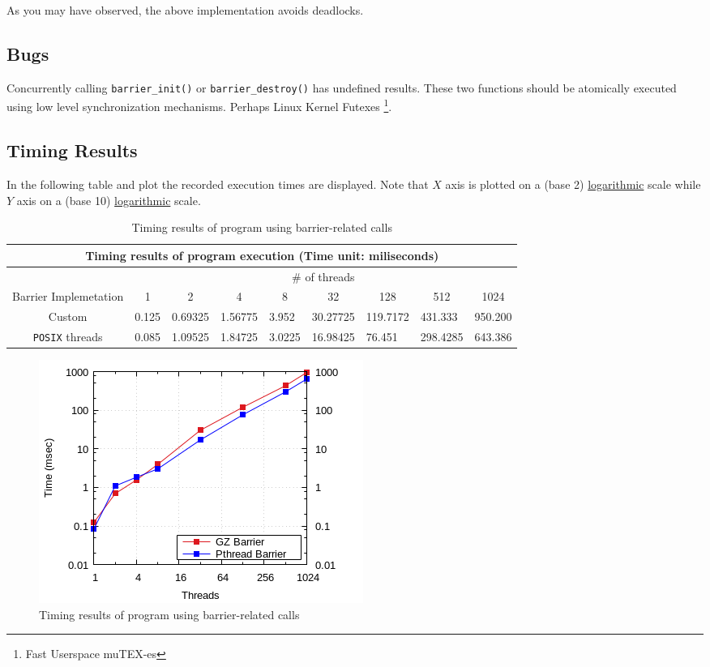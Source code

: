 \documentclass{article}
\def\code#1{\texttt{#1}}
\begin{document}
\hspace{-0.6cm} As you may have observed, the above implementation avoids deadlocks.

\subsection{Bugs}
Concurrently calling \code{barrier\_init()} or \code{barrier\_destroy()} has undefined results.
These two functions should be atomically executed using low level synchronization mechanisms.
Perhaps Linux Kernel Futexes \footnote{Fast Userspace muTEX-es}.

\newpage 

\subsection{Timing Results}
In the following table and plot the recorded execution times are displayed.
Note that $X$ axis is plotted on a (base 2) \underline{logarithmic} scale while
$Y$ axis on a (base 10) \underline{logarithmic} scale.


\begin{table}[htbp]
  \centering
    \begin{tabular}{|c||l|l|l|l|l|l|l|l|} 
    \hline
    \multicolumn{9}{|c|}{Timing results of program execution (Time unit: miliseconds)} \\
    \hline
    & \multicolumn{8}{|c|}{\# of threads} \\
    \hline
    Barrier Implemetation  & \multicolumn{1}{|c|}{1} & \multicolumn{1}{|c|}{2} & \multicolumn{1}{|c|}{4} &
    \multicolumn{1}{|c|}{8} & \multicolumn{1}{|c|}{32} & \multicolumn{1}{|c|}{128} & \multicolumn{1}{|c|}{512} & 
    \multicolumn{1}{|c|}{1024}\\
    \hline\hline
    Custom & 0.125 & 0.69325 & 1.56775 & 3.952 & 30.27725 & 119.7172 & 431.333 & 950.200 \\
    \hline
    \texttt{POSIX} threads & 0.085 & 1.09525 & 1.84725 & 3.0225 & 16.98425 & 76.451 & 298.4285 & 643.386 \\
    \hline
    \end{tabular}
  \caption{Timing results of program using barrier-related calls}
\end{table}


\begin{figure}[htbp]
  \centering
  \includegraphics[width=0.55\columnwidth]{../ex3/plots/barrier.png}
  \caption{Timing results of program using barrier-related calls}
\end{figure}
\end{document}
